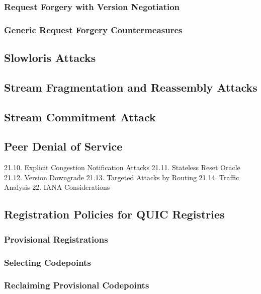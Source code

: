 \documentclass{article}
\begin{document}
\subsubsection{Request Forgery with Version Negotiation}

\subsubsection{Generic Request Forgery Countermeasures}

\subsection{Slowloris Attacks}

\subsection{Stream Fragmentation and Reassembly Attacks}

\subsection{Stream Commitment Attack}

\subsection{Peer Denial of Service}

21.10. Explicit Congestion Notification Attacks 21.11. Stateless Reset Oracle 21.12. Version Downgrade 21.13. Targeted Attacks by Routing 21.14. Traffic Analysis 22. IANA Considerations

\subsection{Registration Policies for QUIC Registries}

\subsubsection{Provisional Registrations}

\subsubsection{Selecting Codepoints}

\subsubsection{Reclaiming Provisional Codepoints}
\end{document}
